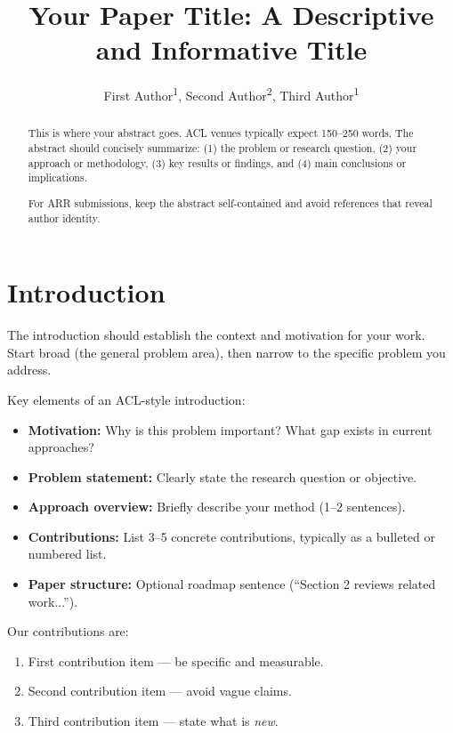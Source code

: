 \documentclass[11pt,a4paper]{article}
\title{Your Paper Title: A Descriptive and Informative Title}
\author{
  First Author\textsuperscript{1},
  Second Author\textsuperscript{2},
  Third Author\textsuperscript{1}}
\begin{document}
\maketitle

\begin{abstract}
This is where your abstract goes. ACL venues typically expect 150--250 words. 
The abstract should concisely summarize:
(1) the problem or research question,
(2) your approach or methodology,
(3) key results or findings, and
(4) main conclusions or implications.

For ARR submissions, keep the abstract self-contained and avoid references 
that reveal author identity.
\end{abstract}

\section{Introduction}

The introduction should establish the context and motivation for your work. 
Start broad (the general problem area), then narrow to the specific problem 
you address.

Key elements of an ACL-style introduction:
\begin{itemize}
  \item \textbf{Motivation:} Why is this problem important? What gap exists 
    in current approaches? \citep{vaswani2017attention}
  \item \textbf{Problem statement:} Clearly state the research question or 
    objective.
  \item \textbf{Approach overview:} Briefly describe your method (1--2 sentences).
  \item \textbf{Contributions:} List 3--5 concrete contributions, typically 
    as a bulleted or numbered list.
  \item \textbf{Paper structure:} Optional roadmap sentence (``Section 2 
    reviews related work...'').
\end{itemize}

Our contributions are:
\begin{enumerate}
  \item First contribution item — be specific and measurable.
  \item Second contribution item — avoid vague claims.
  \item Third contribution item — state what is \emph{new}.
\end{enumerate}
\end{document}
